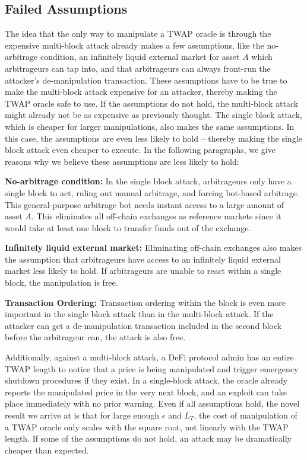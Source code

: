 \subsection{Failed Assumptions}
The idea that the only way to manipulate a TWAP oracle is through the expensive multi-block attack already makes a few assumptions, like the no-arbitrage condition, an infinitely liquid external market for asset $A$ which arbitrageurs can tap into, and that arbitrageurs can always front-run the attacker's de-manipulation transaction. These assumptions have to be true to make the multi-block attack expensive for an attacker, thereby making the TWAP oracle safe to use. If the assumptions do not hold, the multi-block attack might already not be as expensive as previously thought. The single block attack, which is cheaper for larger manipulations, also makes the same assumptions. In this case, the assumptions are even less likely to hold -- thereby making the single block attack even cheaper to execute. In the following paragraphs, we give reasons why we believe these assumptions are less likely to hold: 

\textbf{No-arbitrage condition:} In the single block attack, arbitrageurs only have a single block to act, ruling out manual arbitrage, and forcing bot-based arbitrage. This general-purpose arbitrage bot needs instant access to a large amount of asset $A$. This eliminates all off-chain exchanges as reference markets since it would take at least one block to transfer funds out of the exchange.

\textbf{Infinitely liquid external market:} Eliminating off-chain exchanges also makes the assumption that arbitrageurs have access to an infinitely liquid external market less likely to hold. If arbitrageurs are unable to react within a single block, the manipulation is free.

\textbf{Transaction Ordering:} Transaction ordering within the block is even more important in the single block attack than in the multi-block attack. If the attacker can get a de-manipulation transaction included in the second block before the arbitrageur can, the attack is also free.
\bigskip

Additionally, against a multi-block attack, a DeFi protocol admin has an entire TWAP length to notice that a price is being manipulated and trigger emergency shutdown procedures if they exist. In a single-block attack, the oracle already reports the manipulated price in the very next block, and an exploit can take place immediately with no prior warning. Even if all assumptions hold, the novel result we arrive at is that for large enough $\epsilon$ and $L_T$, the cost of manipulation of a TWAP oracle only scales with the square root, not linearly with the TWAP length. If some of the assumptions do not hold, an attack may be dramatically cheaper than expected. 

